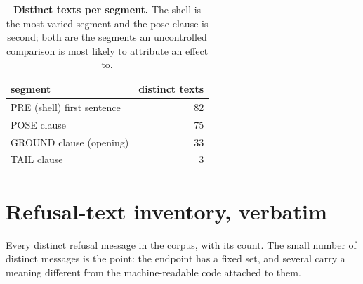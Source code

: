 \begin{table}[H]\centering\small
\begin{tabular}{@{}lr@{}}\toprule
segment & distinct texts \\
\midrule
PRE (shell) first sentence & 82\\
POSE clause & 75\\
GROUND clause (opening) & 33\\
TAIL clause & 3\\
\bottomrule\end{tabular}
\caption{\textbf{Distinct texts per segment.} The shell is the most varied segment and the pose clause is second; both are the segments an uncontrolled comparison is most likely to attribute an effect to.}
\label{tab:appdistinct}\end{table}

\section{Refusal-text inventory, verbatim}
\label{app:reftexts}

Every distinct refusal message in the corpus, with its count. The small number of distinct messages is the point: the endpoint has a fixed set, and several carry a meaning different from the machine-readable code attached to them.

